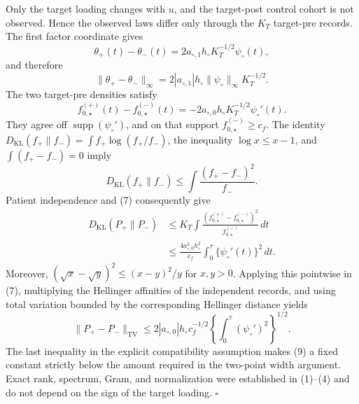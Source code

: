 Only the target loading changes with \(u\), and the target-post control
cohort is not observed.  Hence the observed laws differ only through the
\(K_T\) target-pre records.  The first factor coordinate gives
\[
 \theta_+(t)-\theta_-(t)
 =2a_{\circ,1}h_\circ K_T^{-1/2}\psi_\circ(t),               \tag{5}
\]
and therefore
\[
 \|\theta_+-\theta_-\|_\infty
 =2|a_{\circ,1}|h_\circ\|\psi_\circ\|_\infty K_T^{-1/2}.    \tag{6}
\]
The two target-pre densities satisfy
\[
 f_{0,\star}^{(+)}(t)-f_{0,\star}^{(-)}(t)
 =-2a_{\circ,0}h_\circ K_T^{-1/2}\psi_\circ'(t).             \tag{7}
\]
They agree off \(\operatorname{supp}(\psi_\circ')\), and on that support
\(f_{0,\star}^{(-)}\ge c_f\).  The identity
\(D_{\mathrm{KL}}(f_+\|f_-)=\int f_+\log(f_+/f_-)\), the inequality
\(\log x\le x-1\), and \(\int(f_+-f_-)=0\) imply
\[
 D_{\mathrm{KL}}(f_+\|f_-)
 \le\int\frac{(f_+-f_-)^2}{f_-}.
\]
Patient independence and (7) consequently give
\[
 \begin{split}
 D_{\mathrm{KL}}(P_+\|P_-)
 &\le K_T\int\frac{(f_{0,\star}^{(+)}-f_{0,\star}^{(-)})^2}
                         {f_{0,\star}^{(-)}}\,dt\\
 &\le\frac{4a_{\circ,0}^2h_\circ^2}{c_f}
       \int_0^{\bar\tau}\{\psi_\circ'(t)\}^2\,dt.
 \end{split}                                                \tag{8}
\]
Moreover,
\((\sqrt{x}-\sqrt y)^2\le(x-y)^2/y\) for \(x,y>0\).  Applying this
pointwise in (7), multiplying the Hellinger affinities of the independent
records, and using total variation bounded by the corresponding Hellinger
distance yields
\[
 \|P_+-P_-\|_{\mathrm{TV}}
 \le2|a_{\circ,0}|h_\circ c_f^{-1/2}
       \left\{\int_0^{\bar\tau}(\psi_\circ')^2\right\}^{1/2}. \tag{9}
\]
The last inequality in the explicit compatibility assumption makes (9) a
fixed constant strictly below the amount required in the two-point width
argument.  Exact rank, spectrum, Gram, and normalization were established
in (1)--(4) and do not depend on the sign of the target loading. \(\square\)